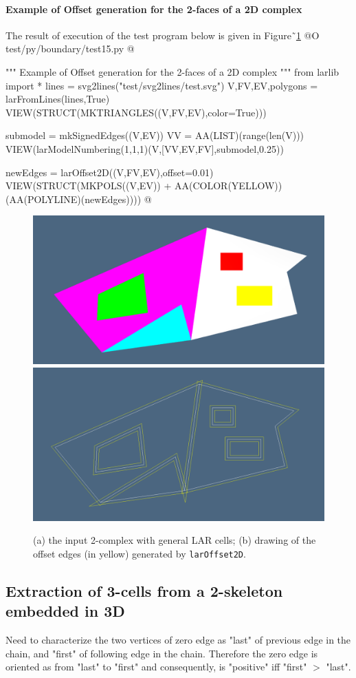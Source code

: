 \documentclass[11pt,oneside]{article}    %
\begin{document}
\paragraph{Example of Offset generation for the 2-faces of a 2D complex}
The result of execution of the test program below is given in Figure˜\ref{fig:offset}
@O test/py/boundary/test15.py
@{""" Example of Offset generation for the 2-faces of a 2D complex """
from larlib import *
lines = svg2lines("test/svg2lines/test.svg")
V,FV,EV,polygons = larFromLines(lines,True)
VIEW(STRUCT(MKTRIANGLES((V,FV,EV),color=True)))

submodel = mkSignedEdges((V,EV))
VV = AA(LIST)(range(len(V)))
VIEW(larModelNumbering(1,1,1)(V,[VV,EV,FV],submodel,0.25))

newEdges = larOffset2D((V,FV,EV),offset=0.01)
VIEW(STRUCT(MKPOLS((V,EV)) + AA(COLOR(YELLOW))(AA(POLYLINE)(newEdges))))
@}

\begin{figure}[htbp] %
   \centering
   \includegraphics[width=0.49\linewidth]{images/offset1} 
   \includegraphics[width=0.49\linewidth]{images/offset2} 
   \caption{(a) the input 2-complex with general LAR cells; (b) drawing of the offset edges (in yellow) generated by \texttt{larOffset2D}.}
   \label{fig:offset}
\end{figure}

\subsection{Extraction of 3-cells from a 2-skeleton embedded in 3D}
Need to characterize the two vertices of zero edge as "last" of previous edge in the chain,
and "first" of following edge in the chain. Therefore the zero edge is oriented as from "last" to "first" and consequently, is "positive" iff  "first" $>$ "last".
\end{document}
